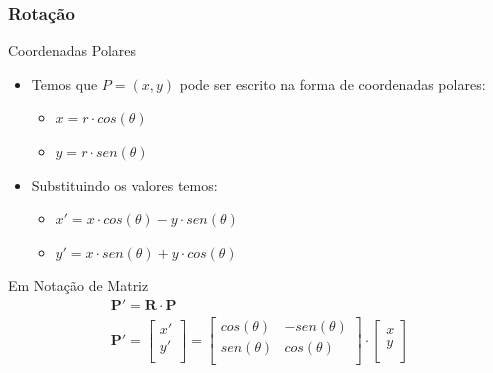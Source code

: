 \documentclass{beamer}
\begin{document}
\begin{frame}
\frametitle{Rotação}

	\begin{block}{Coordenadas Polares}
		\begin{itemize}
			\item<1-> Temos que $P = (x,y)$ pode ser escrito na forma de coordenadas polares:
				\begin{itemize}
					\item $x = r \cdot cos(\theta)$
					\item $y = r \cdot sen(\theta)$ 
				\end{itemize}
			\item<2-> Substituindo os valores temos:
				\begin{itemize}
					\item $x' = x \cdot cos(\theta) - y \cdot sen(\theta)$
					\item $y' = x \cdot sen(\theta) + y \cdot cos(\theta)$
				\end{itemize}
		\end{itemize}
	\end{block}
	
	\begin{block}{Em Notação de Matriz}
		\begin{eqnarray*}
			\textbf{P}' = \textbf{R} \cdot \textbf{P} \\
			\textbf{P}' = 	\begin{bmatrix} 
								x' \\
								y' \\
							\end{bmatrix}
			=
			 \begin{bmatrix}
								cos(\theta) & -sen(\theta) \\
								sen(\theta) & cos(\theta)\\
							\end{bmatrix}
			\cdot \begin{bmatrix}
								x \\
								y \\
							\end{bmatrix}
		\end{eqnarray*}
	\end{block}

	
\end{frame}


\end{document}
